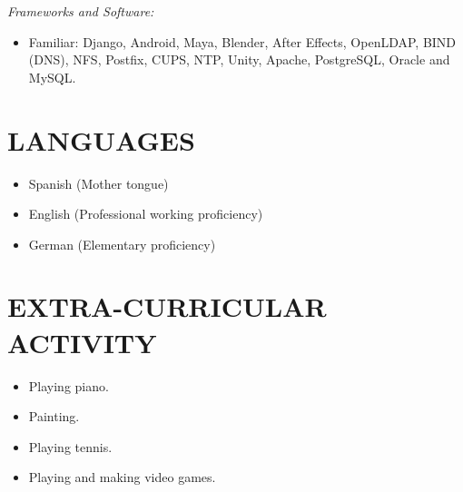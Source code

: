 \documentclass[margin, 10pt]{res} %
\begin{document}
\begin{resume}
{\sl Frameworks and Software:} \\
\begin{itemize} 
\item Familiar: Django, Android, Maya, Blender, After Effects, OpenLDAP, BIND 
  (DNS), NFS, Postfix, CUPS, NTP, Unity, Apache, PostgreSQL, Oracle and MySQL.
\end{itemize} 


\vspace{.5cm}

\section{LANGUAGES}

\begin{itemize} 
\item Spanish (Mother tongue)
\item English (Professional working proficiency)
\item German (Elementary proficiency)
\end{itemize} 


\vspace{.5cm}

\section{EXTRA-CURRICULAR \\ ACTIVITY} 

\begin{itemize}
  \item Playing piano.
  \item Painting.
  \item Playing tennis.
  \item Playing and making video games.
\end{itemize}



\end{resume}
\end{document}
